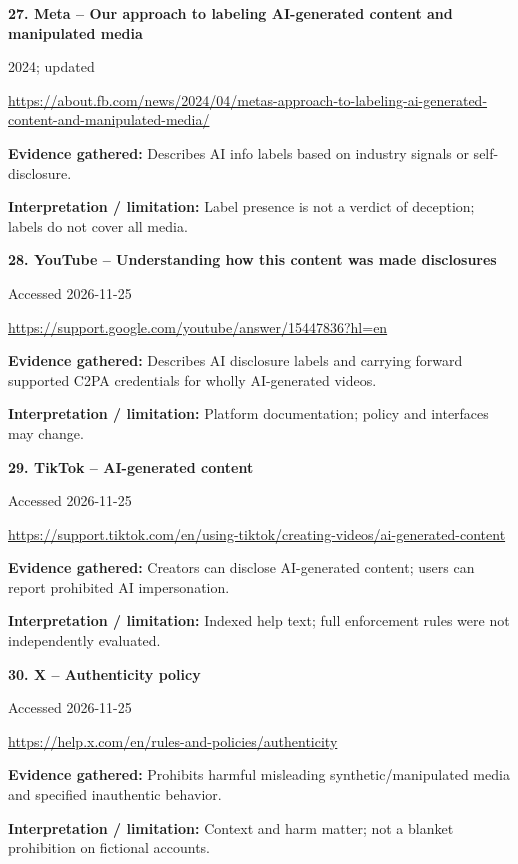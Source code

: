 \documentclass[11pt,a4paper]{article}
\begin{document}
\noindent\begin{minipage}{\linewidth}\textbf{27. Meta -- Our approach to labeling AI-generated content and manipulated media}\par{\small 2024; updated\par\url{https://about.fb.com/news/2024/04/metas-approach-to-labeling-ai-generated-content-and-manipulated-media/}}\par
\textbf{Evidence gathered:} Describes AI info labels based on industry signals or self-disclosure.\par\textbf{Interpretation / limitation:} Label presence is not a verdict of deception; labels do not cover all media.\par
\end{minipage}\par\vspace{2mm}
\noindent\begin{minipage}{\linewidth}\textbf{28. YouTube -- Understanding how this content was made disclosures}\par{\small Accessed 2026-11-25\par\url{https://support.google.com/youtube/answer/15447836?hl=en}}\par
\textbf{Evidence gathered:} Describes AI disclosure labels and carrying forward supported C2PA credentials for wholly AI-generated videos.\par\textbf{Interpretation / limitation:} Platform documentation; policy and interfaces may change.\par
\end{minipage}\par\vspace{2mm}
\noindent\begin{minipage}{\linewidth}\textbf{29. TikTok -- AI-generated content}\par{\small Accessed 2026-11-25\par\url{https://support.tiktok.com/en/using-tiktok/creating-videos/ai-generated-content}}\par
\textbf{Evidence gathered:} Creators can disclose AI-generated content; users can report prohibited AI impersonation.\par\textbf{Interpretation / limitation:} Indexed help text; full enforcement rules were not independently evaluated.\par
\end{minipage}\par\vspace{2mm}
\noindent\begin{minipage}{\linewidth}\textbf{30. X -- Authenticity policy}\par{\small Accessed 2026-11-25\par\url{https://help.x.com/en/rules-and-policies/authenticity}}\par
\textbf{Evidence gathered:} Prohibits harmful misleading synthetic/manipulated media and specified inauthentic behavior.\par\textbf{Interpretation / limitation:} Context and harm matter; not a blanket prohibition on fictional accounts.\par
\end{minipage}\par\vspace{2mm}
\end{document}
